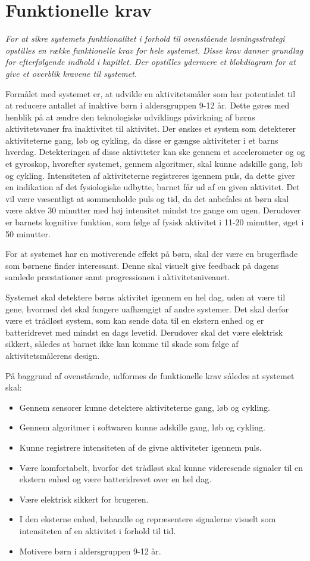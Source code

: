 \section{Funktionelle krav}\label{funktionellekrav}
\textit{For at sikre systemets funktionalitet i forhold til ovenstående løsningsstrategi opstilles en række funktionelle krav for hele systemet. Disse krav danner grundlag for efterfølgende indhold i kapitlet. Der opstilles ydermere et blokdiagram for at give et overblik kravene til systemet.}

Formålet med systemet er, at udvikle en aktivitetsmåler som har potentialet til at reducere antallet af inaktive børn i aldersgruppen 9-12 år. Dette gøres med henblik på at ændre den teknologiske udviklings påvirkning af børns aktivitetsvaner fra inaktivitet til aktivitet.
Der ønskes et system som detekterer aktiviteterne gang, løb og cykling, da disse er gængse aktiviteter i et barns hverdag. Detekteringen af disse aktiviteter kan ske gennem et accelerometer og og et gyroskop, hvorefter systemet, gennem algoritmer, skal kunne adskille gang, løb og cykling.
Intensiteten af aktiviteterne registreres igennem puls, da dette giver en indikation af det fysiologiske udbytte, barnet får ud af en given aktivitet. Det vil være væsentligt at sommenholde puls og tid, da det anbefales at børn skal være aktve 30 minutter med høj intensitet mindst tre gange om ugen. Derudover er barnets kognitive funktion, som følge af fysisk aktivitet i 11-20 minutter, øget i 50 minutter.

For at systemet har en motiverende effekt på børn, skal der være en brugerflade som børnene finder interessant. Denne skal visuelt give feedback på dagens samlede præstationer samt progressionen i aktivitetsniveauet.

Systemet skal detektere børns aktivitet igennem en hel dag, uden at være til gene, hvormed det skal fungere uafhængigt af andre systemer. Det skal derfor være et trådløst system, som kan sende data til en ekstern enhed og er batteridrevet med mindst en dags levetid. Derudover skal det være elektrisk sikkert, således at barnet ikke kan komme til skade som følge af aktivitetsmålerens design. 

På baggrund af ovenstående, udformes de funktionelle krav således at systemet skal: 
\begin{itemize}
	\item Gennem sensorer kunne detektere aktiviteterne gang, løb og cykling.
	\item Gennem algoritmer i softwaren kunne adskille gang, løb og cykling.
	\item Kunne registrere intensiteten af de givne aktiviteter igennem puls.
	\item Være komfortabelt, hvorfor det trådløst skal kunne videresende signaler til en ekstern enhed og være batteridrevet over en hel dag.
	\item Være elektrisk sikkert for brugeren.
	\item I den eksterne enhed, behandle og repræsentere signalerne visuelt som intensiteten af en aktivitet i forhold til tid.
	\item Motivere børn i aldersgruppen 9-12 år. 
\end{itemize}

